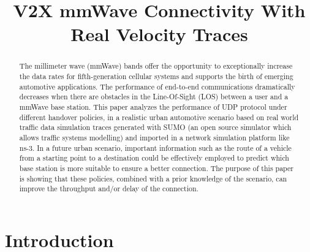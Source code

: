 \documentclass[conference,10pt]{IEEEtran}
\begin{document}
\title{V2X mmWave Connectivity With Real Velocity Traces}

\author{
}

\maketitle

\begin{abstract}
The millimeter wave (mmWave) bands offer the opportunity to exceptionally increase the data rates for fifth-generation cellular systems and supports the birth of emerging automotive applications. The performance of end-to-end communications dramatically decreases when there are obstacles in the Line-Of-Sight (LOS) between a user and a mmWave base station.
This paper analyzes the performance of UDP protocol under different handover policies, in a realistic urban automotive scenario based on real world traffic data simulation traces generated with SUMO (an open source simulator which allows traffic systems modelling) and imported in a network simulation platform like ns-3. In a future urban scenario, important information such as the route of a vehicle from a starting point to a destination could be effectively employed to predict which base station is more suitable to ensure a better connection. The purpose of this paper is showing that these policies, combined with a prior knowledge of the scenario, can improve the throughput and/or delay of the connection.
\end{abstract}

\section{Introduction}\label{sec:intro}
\end{document}
